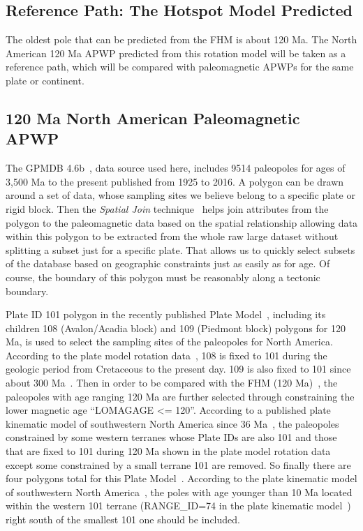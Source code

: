 \subsection{Reference Path: The Hotspot Model Predicted}

The oldest pole that can be predicted from the FHM is about 120 Ma. The North
American 120 Ma APWP predicted from this rotation model will be
taken as a reference path, which will be compared with paleomagnetic APWPs for
the same plate or continent.

\subsection{120 Ma North American Paleomagnetic APWP}

The GPMDB 4.6b~\cite{P05}, data source used here, includes 9514 paleopoles for
ages of 3,500 Ma to the present published from 1925 to 2016. A polygon
can be drawn around a set of data, whose sampling sites we believe belong to a
specific plate or rigid block. Then the {\em Spatial Join\/}
technique~\cite{J07} helps join attributes from the polygon to the paleomagnetic
data based on the spatial relationship allowing data within this polygon to be
extracted from the whole raw large dataset without splitting a subset just for a
specific plate. That allows us to quickly select subsets of the database based
on geographic constraints just as easily as for age. Of course, the boundary of
this polygon must be reasonably along a tectonic boundary.

Plate ID 101 polygon in the recently published Plate Model~\cite{M16}, including
its children 108 (Avalon/Acadia block) and 109 (Piedmont block) polygons for
120 Ma, is used to select the sampling sites of the paleopoles for
North America. According to the plate model rotation data~\cite{M16}, 108 is
fixed to 101 during the geologic period from Cretaceous to the present day. 109
is also fixed to 101 since about 300 Ma~\cite{C14}. Then in order to be compared
with the FHM (120 Ma)~\cite{M93,M99}, the paleopoles with age
ranging 120 Ma are further selected through constraining the lower
magnetic age ``LOMAGAGE <= 120''. According to a published plate kinematic model
of southwestern North America since 36 Ma~\cite{Mc06}, the paleopoles
constrained by some western terranes whose Plate IDs are also 101 and those that
are fixed to 101 during 120 Ma shown in the plate model rotation
data~\cite{M16} except some constrained by a small terrane 101 are removed. So
finally there are four polygons total for this Plate Model~\cite{M16}. According
to the plate kinematic model of southwestern North America~\cite{Mc06}, the
poles with age younger than 10 Ma located within the western 101 terrane
(RANGE\_ID=74 in the plate kinematic model~\cite{Mc06}) right south of the
smallest 101 one should be included.



